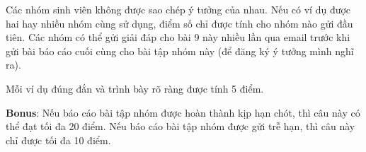 \documentclass[12pt]{article}
\begin{document}
Các nhóm sinh viên không được sao chép ý tưởng của nhau. Nếu có ví dụ được hai hay nhiều nhóm cùng sử dụng, điểm số chỉ được tính cho nhóm nào gửi đầu tiên. Các nhóm có thể gửi giải đáp cho bài 9 này nhiều lần qua email trước khi gửi bài báo cáo cuối cùng cho bài tập nhóm này (để đăng ký ý tưởng mình nghĩ ra).

Mỗi ví dụ đúng đắn và trình bày rõ ràng được tính 5 điểm.

\textbf{Bonus}: Nếu báo cáo bài tập nhóm được hoàn thành kịp hạn chót, thì câu này có thể đạt tối đa 20 điểm. Nếu báo cáo bài tập nhóm được gửi trễ hạn, thì câu này chỉ được tối đa 10 điểm.
\end{document}
